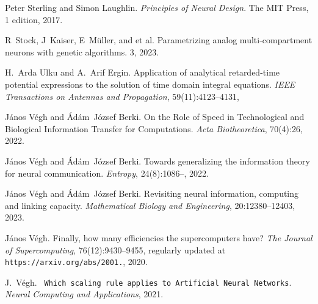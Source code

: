 \begin{DoxyDescription}
\item[\label{citelist_CITEREF_SterlingPrinciples:2017}%
\mbox{[}53\mbox{]}]Peter Sterling and Simon Laughlin. {\itshape Principles of Neural Design}. The MIT Press, 1 edition, 2017.


\item[\label{citelist_CITEREF_MultiCompartmentNeurons:2023}%
\mbox{[}54\mbox{]}]R~Stock, J~Kaiser, E~Müller, and et al. Parametrizing analog multi-\/compartment neurons with genetic algorithms. 3, 2023. 


\item[\label{citelist_CITEREF_RetardedTimePotential:2011}%
\mbox{[}55\mbox{]}]H.~Arda Ulku and A.~Arif Ergin. Application of analytical retarded-\/time potential expressions to the solution of time domain integral equations. {\itshape IEEE Transactions on Antennas and Propagation}, 59(11)\+:4123--4131,
\begin{DoxyEnumerate}
\item 
\end{DoxyEnumerate}


\item[\label{citelist_CITEREF_RoleOfInformationTransferSpeed:2022}%
\mbox{[}56\mbox{]}]J\'{a}nos V\'{e}gh and \'{A}d\'{a}m~J\'{o}zsef Berki. On the Role of Speed in Technological and Biological Information Transfer for Computations. {\itshape Acta Biotheoretica}, 70(4)\+:26, 2022. 


\item[\label{citelist_CITEREF_VeghNeuralShannon:2022}%
\mbox{[}57\mbox{]}]J\'{a}nos V\'{e}gh and \'{A}d\'{a}m~J\'{o}zsef Berki. Towards generalizing the information theory for neural communication. {\itshape Entropy}, 24(8)\+:1086--, 2022. 


\item[\label{citelist_CITEREF_VeghChannelCapacity:2023}%
\mbox{[}58\mbox{]}]J\'{a}nos V\'{e}gh and \'{A}d\'{a}m~J\'{o}zsef Berki. Revisiting neural information, computing and linking capacity. {\itshape Mathematical Biology and Engineering}, 20\+:12380--12403, 2023. 


\item[\label{citelist_CITEREF_VeghHowMany:2020}%
\mbox{[}59\mbox{]}]J\'{a}nos V\'{e}gh. Finally, how many efficiencies the supercomputers have? {\itshape The Journal of Supercomputing}, 76(12)\+:9430--9455, regularly updated at {\texttt{ https\+://arxiv.\+org/abs/2001.}}, 2020.


\item[\label{citelist_CITEREF_VeghScalingANN:2021}%
\mbox{[}60\mbox{]}]J.~V\'{e}gh. {\texttt{ Which scaling rule applies to Artificial Neural Networks}}. {\itshape Neural Computing and Applications}, 2021. 



\end{DoxyDescription}
